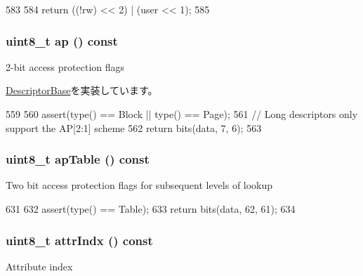 \begin{DoxyCode}
583         {
584             return ((!rw) << 2) | (user << 1);
585         }
\end{DoxyCode}
\hypertarget{classArmISA_1_1TableWalker_1_1LongDescriptor_a4fc87654615da601dbbc3cb6dd1046ee}{
\subsubsection[{ap}]{\setlength{\rightskip}{0pt plus 5cm}uint8\_\-t ap () const}}
\label{classArmISA_1_1TableWalker_1_1LongDescriptor_a4fc87654615da601dbbc3cb6dd1046ee}
2-\/bit access protection flags 

\hyperlink{classArmISA_1_1TableWalker_1_1DescriptorBase_ab524583b20762c07d0a20a418b858586}{DescriptorBase}を実装しています。


\begin{DoxyCode}
559         {
560             assert(type() == Block || type() == Page);
561             // Long descriptors only support the AP[2:1] scheme
562             return bits(data, 7, 6);
563         }
\end{DoxyCode}
\hypertarget{classArmISA_1_1TableWalker_1_1LongDescriptor_a5bfc4dbbd618e97ade22c3243205a334}{
\subsubsection[{apTable}]{\setlength{\rightskip}{0pt plus 5cm}uint8\_\-t apTable () const}}
\label{classArmISA_1_1TableWalker_1_1LongDescriptor_a5bfc4dbbd618e97ade22c3243205a334}
Two bit access protection flags for subsequent levels of lookup 


\begin{DoxyCode}
631         {
632             assert(type() == Table);
633             return bits(data, 62, 61);
634         }
\end{DoxyCode}
\hypertarget{classArmISA_1_1TableWalker_1_1LongDescriptor_a4aa987f33acae31f584caac0c5243b4b}{
\subsubsection[{attrIndx}]{\setlength{\rightskip}{0pt plus 5cm}uint8\_\-t attrIndx () const}}
\label{classArmISA_1_1TableWalker_1_1LongDescriptor_a4aa987f33acae31f584caac0c5243b4b}
Attribute index 


